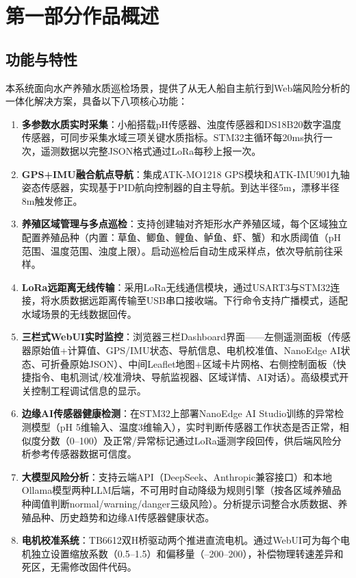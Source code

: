 \documentclass[12pt,a4paper]{ctexart}
\begin{document}
\section{第一部分\quad 作品概述}

\subsection{功能与特性}

本系统面向水产养殖水质巡检场景，提供了从无人船自主航行到Web端风险分析的一体化解决方案，具备以下八项核心功能：

\begin{enumerate}[label=\arabic*.]
    \item \textbf{多参数水质实时采集}：小船搭载pH传感器、浊度传感器和DS18B20数字温度传感器，可同步采集水域三项关键水质指标。STM32主循环每20ms执行一次，遥测数据以完整JSON格式通过LoRa每秒上报一次。

    \item \textbf{GPS+IMU融合航点导航}：集成ATK-MO1218 GPS模块和ATK-IMU901九轴姿态传感器，实现基于PID航向控制器的自主导航。到达半径5m，漂移半径8m触发修正。

    \item \textbf{养殖区域管理与多点巡检}：支持创建轴对齐矩形水产养殖区域，每个区域独立配置养殖品种（内置：草鱼、鲫鱼、鲤鱼、鲈鱼、虾、蟹）和水质阈值（pH范围、温度范围、浊度上限）。启动巡检后自动生成采样点，依次导航前往采样。

    \item \textbf{LoRa远距离无线传输}：采用LoRa无线通信模块，通过USART3与STM32连接，将水质数据远距离传输至USB串口接收端。下行命令支持广播模式，适配水域场景的无线数据回传。

    \item \textbf{三栏式WebUI实时监控}：浏览器三栏Dashboard界面——左侧遥测面板（传感器原始值+计算值、GPS/IMU状态、导航信息、电机校准值、NanoEdge AI状态、可折叠原始JSON）、中间Leaflet地图+区域卡片网格、右侧控制面板（快捷指令、电机测试/校准滑块、导航监视器、区域详情、AI对话）。高级模式开关控制工程调试信息的显示。

    \item \textbf{边缘AI传感器健康检测}：在STM32上部署NanoEdge AI Studio训练的异常检测模型（pH 5维输入、温度3维输入），实时判断传感器工作状态是否正常，相似度分数（0--100）及正常/异常标记通过LoRa遥测字段回传，供后端风险分析参考传感器数据可信度。

    \item \textbf{大模型风险分析}：支持云端API（DeepSeek、Anthropic兼容接口）和本地Ollama模型两种LLM后端，不可用时自动降级为规则引擎（按各区域养殖品种阈值判断normal/warning/danger三级风险）。分析提示词整合水质数据、养殖品种、历史趋势和边缘AI传感器健康状态。

    \item \textbf{电机校准系统}：TB6612双H桥驱动两个推进直流电机。通过WebUI可为每个电机独立设置缩放系数（0.5--1.5）和偏移量（--200--200），补偿物理转速差异和死区，无需修改固件代码。
\end{enumerate}
\end{document}
